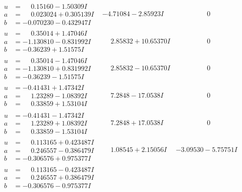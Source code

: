 \documentclass[1p]{elsarticle_modified}
\theoremstyle{definition}
\begin{document}
$$\begin{array}{c|c|c}
\begin{aligned}
u &= \phantom{-}0.15160 - 1.50309 I \\
a &= \phantom{-}0.023024 + 0.305139 I \\
b &= -0.070230 - 0.432947 I\end{aligned}
 & -4.71084 - 2.85923 I & \phantom{-0.000000 } 0 \\ \hline\begin{aligned}
u &= \phantom{-}0.35014 + 1.47046 I \\
a &= -1.130810 - 0.831992 I \\
b &= -0.36239 + 1.51575 I\end{aligned}
 & \phantom{-}2.85832 + 10.65370 I & \phantom{-0.000000 } 0 \\ \hline\begin{aligned}
u &= \phantom{-}0.35014 - 1.47046 I \\
a &= -1.130810 + 0.831992 I \\
b &= -0.36239 - 1.51575 I\end{aligned}
 & \phantom{-}2.85832 - 10.65370 I & \phantom{-0.000000 } 0 \\ \hline\begin{aligned}
u &= -0.41431 + 1.47342 I \\
a &= \phantom{-}1.23289 - 1.08392 I \\
b &= \phantom{-}0.33859 + 1.53104 I\end{aligned}
 & \phantom{-}7.2848 - 17.0538 I & \phantom{-0.000000 } 0 \\ \hline\begin{aligned}
u &= -0.41431 - 1.47342 I \\
a &= \phantom{-}1.23289 + 1.08392 I \\
b &= \phantom{-}0.33859 - 1.53104 I\end{aligned}
 & \phantom{-}7.2848 + 17.0538 I & \phantom{-0.000000 } 0 \\ \hline\begin{aligned}
u &= \phantom{-}0.113165 + 0.423487 I \\
a &= \phantom{-}0.246557 - 0.386479 I \\
b &= -0.306576 + 0.975377 I\end{aligned}
 & \phantom{-}1.08545 + 2.15056 I & -3.09530 - 5.75751 I \\ \hline\begin{aligned}
u &= \phantom{-}0.113165 - 0.423487 I \\
a &= \phantom{-}0.246557 + 0.386479 I \\
b &= -0.306576 - 0.975377 I\end{aligned}

\end{array}$$
\end{document}
